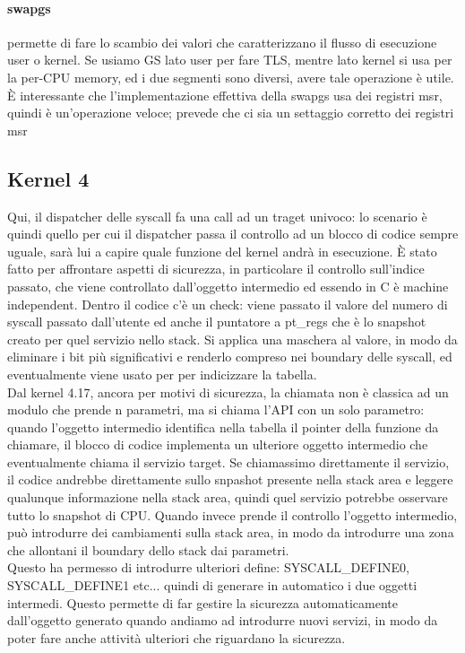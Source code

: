 \documentclass[12pt, oneside]{extbook}
\begin{document}
\paragraph{swapgs} permette di fare lo scambio dei valori che caratterizzano il flusso di esecuzione user o kernel. Se usiamo GS lato user per fare TLS, mentre lato kernel si usa per la per-CPU memory, ed i due segmenti sono diversi, avere tale operazione è utile. È interessante che l'implementazione effettiva della swapgs usa dei registri msr, quindi è un'operazione veloce; prevede che ci sia un settaggio corretto dei registri msr
\subsection{Kernel 4}
Qui, il dispatcher delle syscall fa una call ad un traget univoco: lo scenario è quindi quello per cui il dispatcher passa il controllo ad un blocco di codice sempre uguale, sarà lui a capire quale funzione del kernel andrà in esecuzione. È stato fatto per affrontare aspetti di sicurezza, in particolare il controllo sull'indice passato, che viene controllato dall'oggetto intermedio ed essendo in C è machine independent. Dentro il codice c'è un check: viene passato il valore del numero di syscall passato dall'utente ed anche il puntatore a pt\_regs che è lo snapshot creato per quel servizio nello stack. Si applica una maschera al valore, in modo da eliminare i bit più significativi e renderlo compreso nei boundary delle syscall, ed eventualmente viene usato per per indicizzare la tabella.\\ Dal kernel 4.17, ancora per motivi di sicurezza, la chiamata non è classica ad un modulo che prende n parametri, ma si chiama l'API con un solo parametro: quando l'oggetto intermedio identifica nella tabella il pointer della funzione da chiamare, il blocco di codice implementa un ulteriore oggetto intermedio che eventualmente chiama il servizio target. Se chiamassimo direttamente il servizio, il codice andrebbe direttamente sullo snpashot presente nella stack area e leggere qualunque informazione nella stack area, quindi quel servizio potrebbe osservare tutto lo snapshot di CPU. Quando invece prende il controllo l'oggetto intermedio, può introdurre dei cambiamenti sulla stack area, in modo da introdurre una zona che allontani il boundary dello stack dai parametri.\\ Questo ha permesso di introdurre ulteriori define: \textsf{SYSCALL\_DEFINE0}, \textsf{SYSCALL\_DEFINE1} etc... quindi di generare in automatico i due oggetti intermedi. Questo permette di far gestire la sicurezza automaticamente dall'oggetto generato quando andiamo ad introdurre nuovi servizi, in modo da poter fare anche attività ulteriori che riguardano la sicurezza.\\
\end{document}
